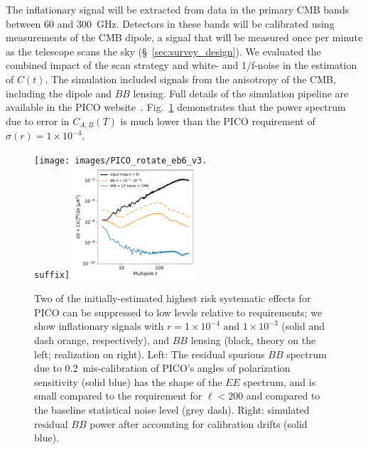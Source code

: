 \documentclass[PICOReport.tex]{subfiles}
\begin{document}
The inflationary signal will be extracted from data in the primary CMB bands between 60 and 300~GHz. Detectors in these bands will be calibrated using measurements of the CMB dipole, a signal that will be measured once per minute as the telescope scans the sky (\S~\ref{sec:survey_design}).  We evaluated the combined impact of the scan strategy and white- and 1/f-noise in the estimation of $C(t)$.
The simulation included signals from the anisotropy of the CMB, including the dipole and $BB$ lensing. Full details of the simulation pipeline are available in the PICO website~\citep{pico_web}. Fig.~\ref{fig:rot_bb_tb_eb} demonstrates that the power spectrum due to error in $C_{A,B} (T)$ is much lower than the PICO requirement of $\sigma(r) = 1\times 10^{-4}$. 
\begin{figure}[thb]
\centerline{
\texttt{[image: images/PICO\_rotate\_eb6\_v3.\\suffix]} 
\hspace{0.3in}
\includegraphics[width=0.41\textwidth]{images/calibration_spectrum_BB.pdf} }
\vspace{-0.1in}
\caption{\captiontext
Two of the initially-estimated highest risk systematic effects for PICO can be suppressed to low levels relative to requirements; we show inflationary signals with  $r = 1\times 10^{-4}\,\, \mbox{and} \,\, 1\times 10^{-3}$ (solid and dash orange, respectively), and $BB$ lensing (black, theory on the left; realization on right). Left: The residual spurious $BB$ spectrum due to 0.2\arcmin\ mis-calibration of PICO's angles of polarization sensitivity (solid blue) has the shape of the $EE$ spectrum, and is small compared to the requirement for $\ell<200$ and compared to the baseline statistical noise level (grey dash). Right: simulated residual $BB$ power after accounting for calibration drifts (solid blue). 
\label{fig:rot_bb_tb_eb} }
\vspace{-0.1in}
\end{figure}
\end{document}
